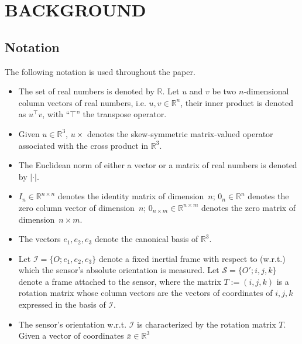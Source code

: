 \section{BACKGROUND}
\label{sec:background}

\subsection{Notation}
The following notation is used throughout the paper.
\begin{itemize}
 \item The set of real numbers is denoted by $\mathbb{R}$. Let $u$ and $v$ be two $n$-dimensional column vectors of real numbers, i.e. $u,v \in \mathbb{R}^n$, 
 their inner product is denoted as $u^\top v$, with ``$\top$'' the transpose operator.
\item Given $u \in \mathbb{R}^3$, $u \times$ denotes the skew-symmetric matrix-valued operator associated with the cross product in 
  $\mathbb{R}^3$.
 \item The Euclidean norm of either a vector or a matrix of real numbers is denoted by $|\cdot |$.
\item $I_n \in \mathbb{R}^{n \times n}$ denotes the identity matrix of dimension~$n$; 
$0_n \in \mathbb{R}^n$ denotes the zero column vector of dimension~$n$; $0_{n \times m} \in \mathbb{R}^{n \times m}$ denotes the zero matrix of dimension~$n \times m$.
\item The vectors $e_1,e_2,e_3$ denote the canonical basis of $\mathbb{R}^3$.
\item Let $\mathcal{I} = \{O;e_1,e_2,e_3\}$ denote a 
fixed inertial frame with respect to (w.r.t.) which the sensor's absolute orientation is measured. 
Let $\mathcal{S} = \{O';i,j,k\}$ denote a frame attached to the sensor, where the matrix $T := (i,j,k)$ is a rotation matrix
whose column vectors are the vectors
of coordinates of $i,j,k$ expressed in the basis of  $\mathcal{I}$. 
\item The sensor's orientation w.r.t. $\mathcal{I}$ is characterized by the rotation matrix $T$. Given a vector of coordinates $\bar{x} \in \mathbb{R}^3$

\end{itemize}
